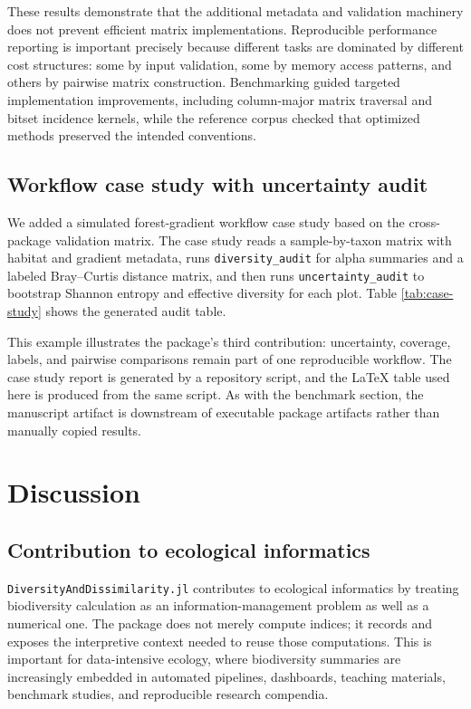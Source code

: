 \documentclass[preprint,12pt,authoryear]{elsarticle}
\begin{document}




These results demonstrate that the additional metadata and validation machinery
does not prevent efficient matrix implementations.  Reproducible performance
reporting is important precisely because different tasks are dominated by
different cost structures: some by input validation, some by memory access
patterns, and others by pairwise matrix construction.  Benchmarking guided
targeted implementation improvements, including column-major matrix traversal
and bitset incidence kernels, while the reference corpus checked that optimized
methods preserved the intended conventions.

\subsection{Workflow case study with uncertainty audit}

We added a simulated forest-gradient workflow case study based on the
cross-package validation matrix.  The case study reads a sample-by-taxon
matrix with habitat and gradient metadata, runs \texttt{diversity\_audit} for
alpha summaries and a labeled Bray--Curtis distance matrix, and then runs
\texttt{uncertainty\_audit} to bootstrap Shannon entropy and effective
diversity for each plot.  Table \ref{tab:case-study} shows the generated
audit table.



This example illustrates the package's third contribution: uncertainty,
coverage, labels, and pairwise comparisons remain part of one reproducible
workflow.  The case study report is generated by a repository script, and the
LaTeX table used here is produced from the same script.  As with the benchmark
section, the manuscript artifact is downstream of executable package
artifacts rather than manually copied results.

\section{Discussion}

\subsection{Contribution to ecological informatics}

\texttt{DiversityAndDissimilarity.jl} contributes to ecological informatics by treating
biodiversity calculation as an information-management problem as well as a
numerical one.  The package does not merely compute indices; it records and
exposes the interpretive context needed to reuse those computations.  This is
important for data-intensive ecology, where biodiversity summaries are
increasingly embedded in automated pipelines, dashboards, teaching materials,
benchmark studies, and reproducible research compendia.
\end{document}
